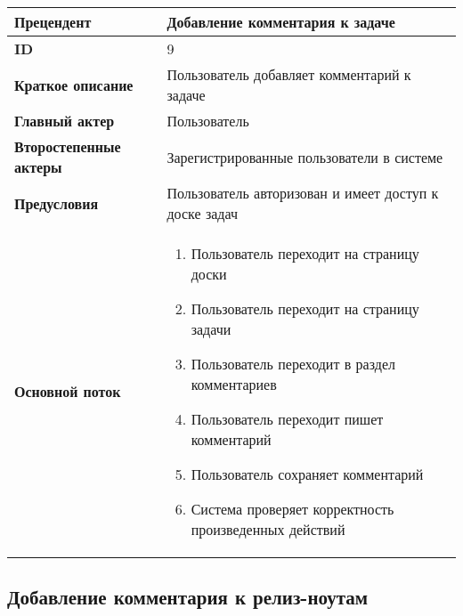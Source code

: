 \documentclass[14pt,a4paper]{extarticle}
\begin{document}
\begin{tabular}{|l|p{9cm}|}
	\hline
	\textbf{Прецендент}            & Добавление комментария к задаче                                             \\
	\hline
	\textbf{ID}                    & 9                                                                           \\
	\hline
	\textbf{Краткое описание}      & Пользователь добавляет комментарий к задаче                		     \\
	\hline
	\textbf{Главный актер}         & Пользователь                                                                \\
	\hline
	\textbf{Второстепенные актеры} & Зарегистрированные пользователи в системе                                   \\
	\hline
	\textbf{Предусловия}           & Пользователь авторизован и имеет доступ к доске задач                       \\
	\hline
	\textbf{Основной поток}        & \begin{enumerate}
		                                 \item Пользователь переходит на страницу доски
		                                 \item Пользователь переходит на страницу задачи
						 \item Пользователь переходит в раздел комментариев
					         \item Пользователь переходит пишет комментарий
					         \item Пользователь сохраняет комментарий
		                                 \item Система проверяет корректность произведенных действий
	                                 \end{enumerate} \\
	\hline
\end{tabular}

\subsection{Добавление комментария к релиз-ноутам}
\end{document}
